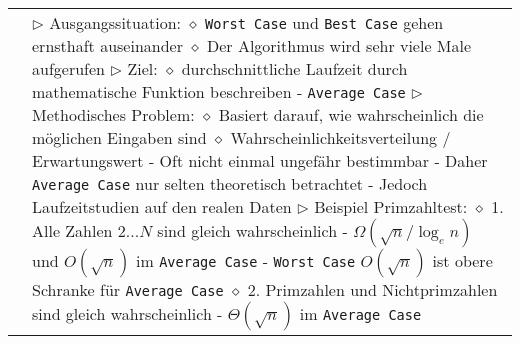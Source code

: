 \begin{longtable}{ | p{} p{} | }
	\makecell[l]{Average Case} & \makecell[l]{
	$\triangleright$ Ausgangssituation: \\
	\hspace{0.4cm} $\diamond$ \texttt{Worst Case} und \texttt{Best Case} gehen ernsthaft auseinander \\ 
	\hspace{0.4cm} $\diamond$ Der Algorithmus wird sehr viele Male aufgerufen \\
	$\triangleright$ Ziel: \\
	\hspace{0.4cm} $\diamond$ durchschnittliche Laufzeit durch mathematische Funktion beschreiben \\
	\hspace{0.6cm} - \texttt{Average Case} \\
	$\triangleright$ Methodisches Problem: \\
	\hspace{0.4cm} $\diamond$ Basiert darauf, wie wahrscheinlich die möglichen Eingaben sind \\
	\hspace{0.4cm} $\diamond$ Wahrscheinlichkeitsverteilung / Erwartungswert \\
	\hspace{0.6cm} - Oft nicht einmal ungefähr bestimmbar \\
	\hspace{0.6cm} - Daher \texttt{Average Case} nur selten theoretisch betrachtet \\
	\hspace{0.6cm} - Jedoch Laufzeitstudien auf den realen Daten \\
	$\triangleright$ Beispiel Primzahltest: \\
	\hspace{0.4cm} $\diamond$ 1. Alle Zahlen $2...N$ sind gleich wahrscheinlich \\
	\hspace{0.6cm} - $\Omega(\sqrt{n} / \log_e n)$ und $O(\sqrt{n})$ im \texttt{Average Case} \\
	\hspace{0.6cm} - \texttt{Worst Case} $O(\sqrt{n})$ ist obere Schranke für \texttt{Average Case} \\
	\hspace{0.4cm} $\diamond$ 2. Primzahlen und Nichtprimzahlen sind gleich wahrscheinlich \\
	\hspace{0.6cm} - $\Theta(\sqrt{n})$ im \texttt{Average Case} \\
}
\end{longtable}
